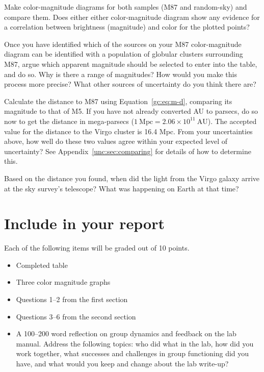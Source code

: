 \begin{steps}
	\item Make color-magnitude diagrams for both samples (M87 and random-sky)
	and compare them. Does either either color-magnitude diagram show any
	evidence for a correlation between brightness (magnitude) and color for the
	plotted points?
	
	\item Once you have identified which of the sources on your M87 color-magnitude
	diagram can be identified with a population of globular clusters surrounding
	M87, argue which apparent magnitude should be selected to enter into the table, and do so. Why is there a range of magnitudes? How would you make this
	process more precise? What other sources of uncertainty do you think
	there are?
	
	\item Calculate the distance to M87 using Equation~\ref{gc:eq:m-d}, comparing its magnitude to that of M5. If you have not already converted AU to
	parsecs, do so now to get the distance in mega-parsecs ($1\:\mathrm{Mpc} = 2.06 \times
	10^{11}\:\mathrm{AU}$). The accepted value for the distance to the Virgo cluster is 16.4
	Mpc. From your uncertainties above, how well do these two values agree within your expected level
	of uncertainty? See Appendix~\ref{unc:sec:comparing} for details of how to determine this.
	
	\item Based on the distance you found, when did the light from the Virgo galaxy arrive at the sky survey's telescope? What was happening on Earth at that time?
\end{steps}

\section{Include in your report}

Each of the following items will be graded out of 10 points.

\begin{itemize}
	\item Completed table
	
	\item Three color magnitude graphs
	
	\item Questions 1--2 from the first section
	
	\item Questions 3--6 from the second section
	
	\item A 100--200 word reflection on group dynamics and feedback on the lab manual. Address the following topics: who did what in the lab, how did you work together, what successes and challenges in group functioning did you have, and what would you keep and change about the lab write-up?
		
\end{itemize}